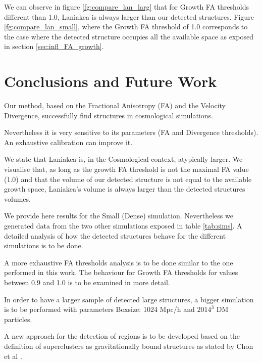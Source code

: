 \documentclass[12pt]{article}
\begin{document}
\begin{par}
We can observe in figure \ref{fg:compare_lan_larg}  that for Growth FA thresholds
 different than 1.0, Laniakea is always larger than
  our detected structures. Figure \ref{fg:compare_lan_small}, where the Growth FA threshold
   of 1.0 corresponds to the case where the
    detected structure occupies all the available
     space as exposed in section
      \ref{sec:infl_FA_growth}.
\end{par}



\section{Conclusions and Future Work}
\label{sec:discussions}
\begin{par}
Our method, based on the Fractional Anisotropy (FA) and the Velocity Divergence, successfully find structures in cosmological simulations. \\
\end{par}
\begin{par}
Nevertheless it is very sensitive to its parameters (FA and Divergence thresholds). An exhaustive calibration can improve it.\\
\end{par}
\begin{par}
We state that Laniakea is, in the Cosmological
 context, atypically larger. We visualise that, as
  long as the growth FA threshold is not the
   maximal FA value (1.0) and that the volume of
    our detected structure is not equal to the
     available growth space, Laniakea's volume is
      always larger than the detected structures
       volumes. \\
\end{par}


\begin{par}
We provide here results for the Small (Dense)
 simulation. Nevertheless we generated data from
  the two other simulations exposed in table
   \ref{tab:sims}. A detailed analysis of how the
    detected structures behave for the different
     simulations is to be done.\\
\end{par}
\begin{par}
A more exhaustive FA thresholds analysis is to be
 done similar to the one performed in this work.
  The behaviour for Growth FA thresholds for values
   between 0.9 and 1.0 is to be examined in more
    detail.
\end{par}
\begin{par}
In order to have a larger sample of detected large
 structures, a bigger simulation is to be performed
  with parameters Boxsize: 1024 Mpc/h and $2014^3$
   DM particles. \\
\end{par}
\begin{par}
A new approach for the detection of regions is to
 be developed based on the definition of
  superclusters as gravitationally bound structures
   as stated by Chon et al
    \cite{chon_definition_2015}.
\end{par}
\end{document}
